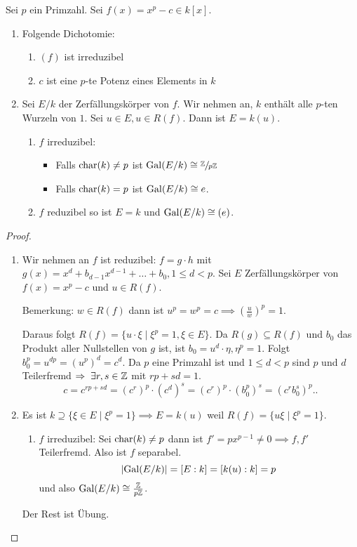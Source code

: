 \begin{lemma}
	Sei $p$ ein Primzahl. Sei $f(x) = x^{p}-c \in k[x]$.
	\begin{enumerate}[(1)]
		\item Folgende Dichotomie:
			\begin{enumerate}[({1}.1)]
				\item $(f)$ ist irreduzibel
				\item $c$ ist eine $p$-te Potenz eines Elements in $k$
			\end{enumerate}
		\item Sei $E / k$ der Zerfällungskörper von $f$. Wir nehmen an, $k$ enthält alle $p$-ten Wurzeln von $1$.
			Sei $u \in E, u \in R(f)$. Dann ist $E = k(u)$.
			\begin{enumerate}[(2.1)]
				\item $f$ irreduzibel:
					\begin{itemize}
						\item Falls $\operatorname{char}(k) \neq p$ ist $\operatorname{Gal}(E / k) \cong \sfrac{\mathbb{Z}}{p \mathbb{Z}}$ 
						\item Falls $\operatorname{char}(k) = p$ ist $\operatorname{Gal}(E / k) \cong e$.
					\end{itemize}
				\item $f$ reduzibel so ist $E = k$ und $\operatorname{Gal}(E / k) \cong (e)$.
			\end{enumerate}
	\end{enumerate}
\end{lemma}

\begin{proof}
	\begin{enumerate}[(1)]
		\item Wir nehmen an $f$ ist reduzibel: $f = g \cdot h$ mit $g(x) = x^{d} + b_{d-1} x^{d-1} + \ldots + b_0, 1 \leq d < p$.
			Sei $E$ Zerfällungskörper von $f(x) = x^{p}-c$ und $u \in R(f)$.

			Bemerkung: $w \in R(f)$ dann ist $u^{p} = w^{p} = c \implies (\frac{u}{w})^{p} = 1$.

			Daraus folgt $R(f) = \{u \cdot \xi \mid \xi^{p} = 1, \xi \in E\}$.
			Da $R(g) \subseteq R(f)$ und $b_0$ das Produkt aller Nullstellen von $g$ ist, ist $b_0 = u^{d} \cdot \eta, \eta^{p} =1$.
			Folgt $b_0^{p} = u^{d p} = (u^{p})^{d} = c^{d}$.
			Da $p$ eine Primzahl ist und $1 \leq d < p$ sind $p$ und $d$ Teilerfremd $\implies \exists r,s \in \Z$ mit $r p + s d = 1$.
			\[
				c = c^{rp + sd} =  (c^{r})^{p} \cdot (c^{d})^{s} = (c^{r})^{p} \cdot (b_0^{p})^{s} = (c^{r} b_0^{s})^{p}.
			.\] 
		\item Es ist $k \supseteq \{\xi \in E \mid \xi^{p} = 1\} \implies E = k(u)$ weil $R(f) = \{u \xi \mid \xi^{p} = 1\}$.
			\begin{enumerate}[(1)]
				\item $f$ irreduzibel: Sei $\operatorname{char}(k) \neq p$ dann ist $f' = p x^{p-1} \neq 0 \implies f, f'$ Teilerfremd.
					Also ist $f$ separabel.
					\[
						\abs{\operatorname{Gal}(E / k)} = [E : k] = [k(u) : k] = p
					\] 
					und also $\operatorname{Gal}(E / k) \cong \frac{\mathbb{Z}}{p \mathbb{Z}}$.
			\end{enumerate}
			Der Rest ist Übung.
	\end{enumerate}
\end{proof}


